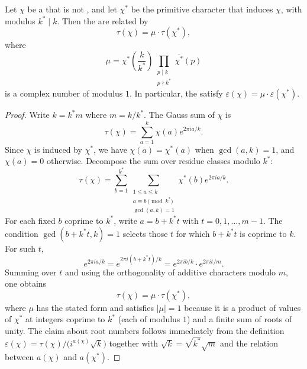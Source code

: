 \begin{proposition} \label{proposition:gauss_sums_of_imprimitive_dirichlet_characters_factor_through_inducing_primitive_character}
Let $\chi$ be a  that is not , and let $\chi^*$ be the primitive character that induces $\chi$, with modulus $k^* \mid k$. Then the  are related by
$$\tau(\chi) = \mu \cdot \tau(\chi^*),$$
where
$$\mu = \chi^*\!\left(\frac{k}{k^*}\right) \prod_{\substack{p \mid k \\ p \nmid k^*}} \overline{\chi^*}(p)$$
is a complex number of modulus $1$. In particular, the  satisfy $\varepsilon(\chi) = \mu \cdot \varepsilon(\chi^*)$.
\end{proposition}
\begin{proof}
Write $k = k^* m$ where $m = k/k^*$. The Gauss sum of $\chi$ is
$$\tau(\chi) = \sum_{a=1}^{k} \chi(a) e^{2\pi i a/k}.$$
Since $\chi$ is induced by $\chi^*$, we have $\chi(a) = \chi^*(a)$ when $\gcd(a, k) = 1$, and $\chi(a) = 0$ otherwise. Decompose the sum over residue classes modulo $k^*$:
$$\tau(\chi) = \sum_{b=1}^{k^*} \sum_{\substack{1 \leq a \leq k \\ a \equiv b \pmod{k^*} \\ \gcd(a,k)=1}} \chi^*(b) e^{2\pi i a/k}.$$
For each fixed $b$ coprime to $k^*$, write $a = b + k^* t$ with $t = 0, 1, \dots, m-1$. The condition $\gcd(b + k^* t, k) = 1$ selects those $t$ for which $b + k^* t$ is coprime to $k$. For such $t$,
$$e^{2\pi i a/k} = e^{2\pi i (b + k^* t)/k} = e^{2\pi i b/k} \cdot e^{2\pi i t/m}.$$
Summing over $t$ and using the orthogonality of additive characters modulo $m$, one obtains
$$\tau(\chi) = \mu \cdot \tau(\chi^*),$$
where $\mu$ has the stated form and satisfies $|\mu| = 1$ because it is a product of values of $\chi^*$ at integers coprime to $k^*$ (each of modulus $1$) and a finite sum of roots of unity. The claim about root numbers follows immediately from the definition $\varepsilon(\chi) = \tau(\chi)/\bigl(i^{a(\chi)}\sqrt{k}\bigr)$ together with $\sqrt{k} = \sqrt{k^*}\sqrt{m}$ and the relation between $a(\chi)$ and $a(\chi^*)$.
\end{proof}